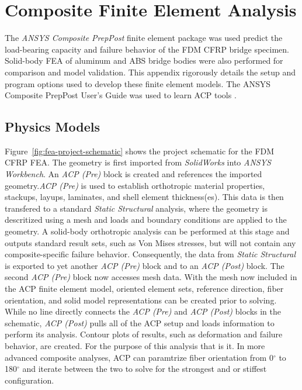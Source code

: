 \section{Composite Finite Element Analysis}

\indent

The \textit{ANSYS Composite PrepPost} finite element package was used predict the load-bearing capacity and failure behavior of the FDM CFRP bridge specimen. Solid-body FEA of aluminum and ABS bridge bodies were also performed for comparison and model validation. This appendix rigorously details the setup and program options used to develop these finite element models. The ANSYS Composite PrepPost User's Guide was used to learn ACP tools \cite{ACP-manual}.\\

\subsection{Physics Models}

\indent

Figure~\ref{fig:fea-project-schematic} shows the project schematic for the FDM CFRP FEA. The geometry is first imported from \emph{SolidWorks} into \emph{ANSYS Workbench}. An \textit{ACP (Pre)} block is created and references the imported geometry.\textit{ACP (Pre)} is used to establish orthotropic material properties, stackups, layups, laminates, and shell element thickness(es). This data is then transfered to a standard \textit{Static Structural} analysis, where the geometry is descritized using a mesh and loads and boundary conditions are applied to the geometry. A solid-body orthotropic analysis can be performed at this stage and outputs standard result sets, such as Von Mises stresses, but will not contain any composite-specific failure behavior. Consequently, the data from \textit{Static Structural} is exported to yet another \textit{ACP (Pre)} block and to an \textit{ACP (Post)} block. The second \textit{ACP (Pre)} block now accesses mesh data. With the mesh now included in the ACP finite element model, oriented element sets, reference direction, fiber orientation, and solid model representations can be created prior to solving. While no line directly connects the \textit{ACP (Pre)} and \textit{ACP (Post)} blocks in the schematic, \textit{ACP (Post)} pulls all of the ACP setup and loads information to perform its analysis. Contour plots of results, such as deformation and failure behavior, are created. For the purpose of this analysis that is it. In more advanced composite analyses, ACP can paramtrize fiber orientation from 0$^{\circ}$ to 180$^{\circ}$ and iterate between the two to solve for the strongest and or stiffest configuration.\\

